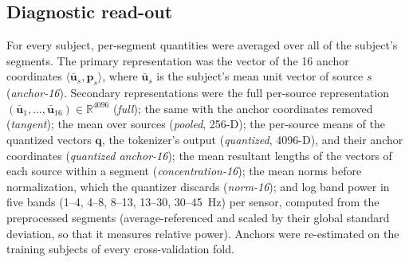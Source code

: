 \documentclass[10pt,letterpaper]{article}
\newcommand{\R}{\mathbb{R}}
\newcommand{\anchor}{\bm{p}}
\newcommand{\uvec}{\bm{u}}
\begin{document}
\subsection*{Diagnostic read-out}\label{sec:methods-readout}

For every subject, per-segment quantities were averaged over all of the subject's
segments. The primary representation was the vector of the 16 anchor coordinates
$\langle\bar{\uvec}_s,\anchor_s\rangle$, where $\bar{\uvec}_s$ is the subject's mean unit vector
of source $s$ (\emph{anchor-16}). Secondary representations were the full
per-source representation $(\bar{\uvec}_1,\dots,\bar{\uvec}_{16})\in\R^{4096}$
(\emph{full}); the same with the anchor coordinates removed (\emph{tangent}); the mean over
sources (\emph{pooled}, 256-D); the per-source means of the quantized vectors $\bm{q}$, the
tokenizer's output (\emph{quantized}, 4096-D), and their anchor coordinates (\emph{quantized
anchor-16}); the mean resultant lengths of the vectors of each source within a segment
(\emph{concentration-16}); the mean norms before normalization, which the quantizer discards
(\emph{norm-16}); and log band power in five bands (1--4, 4--8, 8--13, 13--30, 30--45~Hz) per
sensor, computed from the preprocessed segments (average-referenced and scaled by their global
standard deviation, so that it measures relative power). Anchors were re-estimated on the
training subjects of every cross-validation fold.
\end{document}

